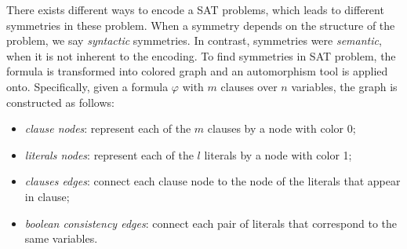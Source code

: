 There exists different ways to encode a SAT problems,
which leads to different symmetries in these problem.
When a symmetry depends on the structure of the problem, we say \emph{syntactic} symmetries. 
In contrast, symmetries were \emph{semantic}, when it is not inherent to the encoding.
To find symmetries in SAT problem, the formula is transformed into colored graph
and an automorphism tool is applied onto. Specifically, given a formula $\varphi$ with
$m$ clauses over $n$ variables, the graph is constructed as follows:
\begin{itemize}
	\item \emph{clause nodes}: represent each of the $m$ clauses by a node with color 0;
	\item \emph{literals nodes}: represent each of the $l$ literals by a node with color 1;
	\item \emph{clauses edges}: connect each clause node to the node of the literals that appear in clause;
	\item \emph{boolean consistency edges}: connect each pair of literals that correspond to the same variables.
\end{itemize}


